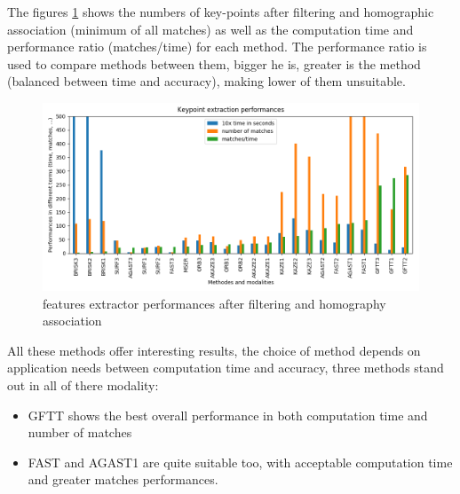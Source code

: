 \documentclass[a4paper,twoside]{article}
\begin{document}
	The figures \ref{fig:features-performances} shows the numbers of key-points after filtering and homographic association (minimum of all matches)
	as well as the computation time and performance ratio (matches/time) for each method.
	The performance ratio is used to compare methods between them, bigger he is,
	greater is the method (balanced between time and accuracy), making lower of them unsuitable.
	
	\begin{figure}[h]
		\centering
		\includegraphics[height=0.9\linewidth, angle=90]{../figures/comparaison-keypoint-performances.png}
		\caption{features extractor performances after filtering and homography association}
		\label{fig:features-performances}
	\end{figure}
	
	All these methods offer interesting results, the choice of method depends on application needs between computation time and accuracy,
	three methods stand out in all of there modality:
	
	\begin{itemize}
		\item GFTT shows the best overall performance in both computation time and number of matches
		\item FAST and AGAST1 are quite suitable too, with acceptable computation time and greater matches performances.
	\end{itemize}
	
\end{document}
